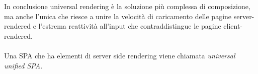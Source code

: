 In conclusione universal rendering è la soluzione più complessa di composizione,
 ma anche l'unica che riesce a unire la velocità di caricamento delle pagine server-rendered
e l'estrema reattività all'input che contraddistingue le pagine client-rendered.
\\\\Una SPA che ha elementi di server side rendering viene chiamata \emph{universal unified SPA}.

